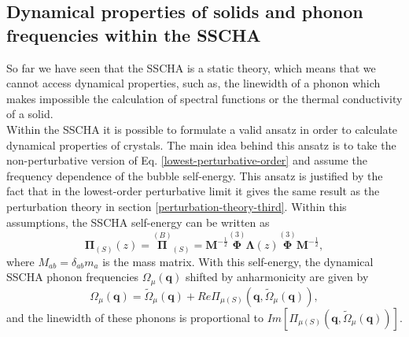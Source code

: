 \subsection{Dynamical properties of solids and phonon frequencies within the SSCHA}
\label{dynamical-sscha}

So far we have seen that the SSCHA is a static theory, which means that we cannot access dynamical properties, such as, the linewidth of a phonon which makes impossible the calculation of spectral functions or 
the thermal conductivity of a solid. \\

Within the SSCHA it is possible to formulate a valid ansatz in order to calculate dynamical properties of crystals. The main idea behind this ansatz is to take the non-perturbative 
version of Eq. \ref{lowest-perturbative-order} and assume the frequency dependence of the bubble self-energy. This ansatz is justified by the fact that in the lowest-order perturbative limit it gives the same result 
as the perturbation theory in section \ref{perturbation-theory-third}. Within this assumptions, the SSCHA self-energy can be written as\cite{bianco2017second}
\begin{equation}
 \boldsymbol{\Pi}_{(S)}(z)=\overset{(B)}{\boldsymbol{\Pi}}_{(S)}=\boldsymbol{M}^{-\frac{1}{2}}\overset{(3)}{\boldsymbol{\Phi}}\boldsymbol{\Lambda}(z)\overset{(3)}{\boldsymbol{\Phi}}\boldsymbol{M}^{-\frac{1}{2}},
\end{equation} 
where $M_{ab}=\delta_{ab}m_{a}$ is the mass matrix. With this self-energy, the dynamical SSCHA phonon frequencies $\Omega_{\mu}(\mathbf{q})$ shifted by anharmonicity are given by
\begin{equation}
 \Omega_{\mu}(\mathbf{q})=\tilde{\Omega}_{\mu}(\mathbf{q})+Re\Pi_{\mu(S)}(\mathbf{q},\tilde{\Omega}_{\mu}(\mathbf{q})),
\end{equation}
and the linewidth of these phonons is proportional to $Im[\Pi_{\mu(S)}(\mathbf{q},\tilde{\Omega}_{\mu}(\mathbf{q}))]$. \\

